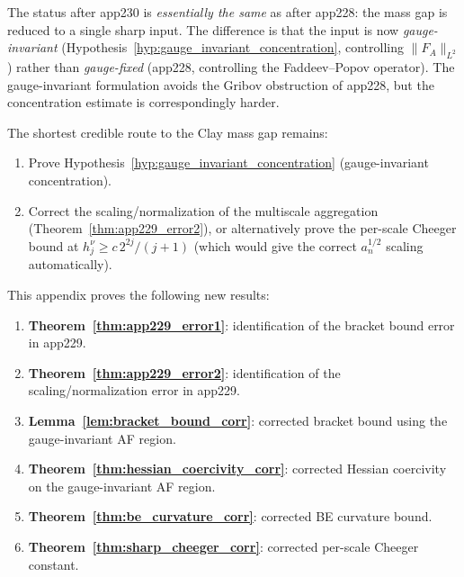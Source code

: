 \begin{remark}
\label{rem:comparison_app226}
The status after app230 is \emph{essentially the same} as after
app228: the mass gap is reduced to a single sharp input. The
difference is that the input is now \emph{gauge-invariant}
(Hypothesis~\ref{hyp:gauge_invariant_concentration}, controlling
$\|F_{A}\|_{L^{2}}$) rather than \emph{gauge-fixed}
(app228, controlling the Faddeev--Popov operator). The
gauge-invariant formulation avoids the Gribov obstruction of
app228, but the concentration estimate is correspondingly harder.

The shortest credible route to the Clay mass gap remains:
\begin{enumerate}
\item Prove Hypothesis~\ref{hyp:gauge_invariant_concentration}
(gauge-invariant concentration).
\item Correct the scaling/normalization of the multiscale
aggregation (Theorem~\ref{thm:app229_error2}), or alternatively
prove the per-scale Cheeger bound at
$h_{j}^{\nu}\ge c\,2^{2j}/(j+1)$ (which would give the correct
$a_{n}^{1/2}$ scaling automatically).
\end{enumerate}
\end{remark}

\begin{remark}
\label{rem:app230_new}
This appendix proves the following new results:
\begin{enumerate}
\item \textbf{Theorem~\ref{thm:app229_error1}}: identification of
the bracket bound error in app229.
\item \textbf{Theorem~\ref{thm:app229_error2}}: identification of
the scaling/normalization error in app229.
\item \textbf{Lemma~\ref{lem:bracket_bound_corr}}: corrected
bracket bound using the gauge-invariant AF region.
\item \textbf{Theorem~\ref{thm:hessian_coercivity_corr}}:
corrected Hessian coercivity on the gauge-invariant AF region.
\item \textbf{Theorem~\ref{thm:be_curvature_corr}}: corrected
BE curvature bound.
\item \textbf{Theorem~\ref{thm:sharp_cheeger_corr}}: corrected
per-scale Cheeger constant.
\end{enumerate}
\end{remark}

\endinput
